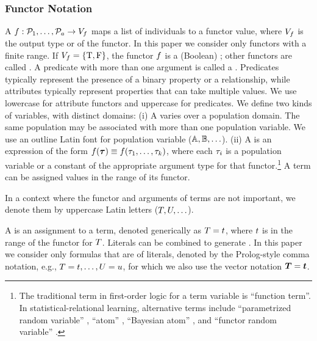 \documentclass[runningheads,a4paper]{llncs}
\begin{document}
\subsubsection{Functor Notation}
A 
$
f: \mathcal{P}_{1},\ldots,\mathcal{P}_{a} \rightarrow V_{f}
$
maps a list of individuals to a functor value, 
where $V_{f}$ is the output type or  of the functor. In this paper we consider only functors with a finite range.
If $V_{f} = \{\mathrm{T},\mathrm{F}\}$, the functor $f$ is a (Boolean) ; other functors are called . A predicate with more than one argument is called a . Predicates typically represent the presence of a binary property or a relationship, while attributes typically represent properties that can take multiple values. 
We use lowercase for attribute functors and uppercase for predicates.
We define two kinds of variables, with distinct domains: (i) A  varies over a population domain. The same population may be associated with more than one population variable. We use an outline Latin font for population variable ($\mathbb{A},\mathbb{B},\ldots$).
(ii) A 
is an expression of the form $f(\boldsymbol{\tau}) \equiv f(\tau_{1},\ldots,\tau_{k})$, where 
each $\tau_{i}$ is a population variable or a constant of the appropriate argument type for that functor.\footnote{The traditional term in first-order logic for a term variable is ``function term''. In statistical-relational learning, alternative terms include ``parametrized random variable'' \cite{Poole2003}, ``atom'' \cite{Chiang2012}, ``Bayesian atom''  \cite{Kersting2007}, and ``functor random variable'' \cite{Schulte2012}.} A term can be assigned values in the range of its functor.

In a context where the functor and arguments of terms are not important, we denote them by uppercase Latin letters ($T,U,\ldots$).

A  is an assignment to a term, denoted generically as $T = t$, where $t$ is in the range of the functor for $T$. 
Literals can be combined to generate . 
In this paper we consider only formulas that are  of literals, denoted by the Prolog-style comma notation, e.g., 
$T = t, \ldots, U = u$, for which we also use the  vector notation $\TF = \TTuple$.
\end{document}
